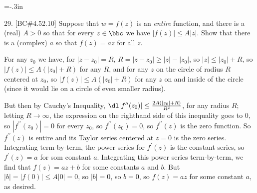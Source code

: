 




\vsize=8in
\voffset=-.3in


\loadmsbm


\dl{\displaystyle}
\ctln{\centerline}
\ssk{\smallskip}
\msk{\medskip}
\bsk{\bigskip}
\ubr{\underbar}


\overfullrule=0pt
\nopagenumbers






\msk




\bsk

\bsk


\item{29.}  [BC\#4.52.10] Suppose that $w=f(z)$ is an {\it entire} function,
and there is a (real) $A>0$ so that for every $z\in\bbc$ we have
$|f(z)|\leq A|z|$. Show that there is a (complex) $a$ so that $f(z)=az$
for all $z$.


\msk

\item{} For any $z_0$ we have, for $|z-z_0|=R$, $R=|z-z_0|\geq |z|-|z_0|$, so 
$|z|\leq |z_0|+R$, so $|f(z)|\leq A(|z_0|+R)$ for any $R$, and for any
$z$ on the circle of radius $R$ centered at $z_0$, so $|f(z)|\leq A(|z_0|+R)$
for any $z$ on and inside of the circle (since it would lie on a 
circle of even smaller radius).

\ssk

\item{} But then by Cauchy's Inequality, $\dl|f^{\prime\prime}(z_0)|\leq {{2A(|z_0|+R)}\over{R^2}}$,
for any radius $R$; letting $R\rightarrow\infty$, the expression on the
righthand side of this inequality goes to $0$, so $|f^{\prime\prime}(z_0)|=0$ for every
$z_0$, so $f^{\prime\prime}(z_0)=0$, so $f^{\prime\prime}(z)$ is the zero function.
So $f^{\prime\prime}(z)$ is entire and its Taylor series centered at $z=0$ is the zero series.
Integrating term-by-term, the power series for $f^{\prime}(z)$ is the constant series, so 
$f^{\prime}(z)=a$ for som constant $a$. Integrating this power series term-by-term, we 
find that $f(z)=az+b$  for some constants $a$ and $b$. But $|b|=|f(0)|\leq A|0|=0$, so
$|b|=0$, so $b=0$, so $f(z)=az$ for some constant $a$, as desired.






